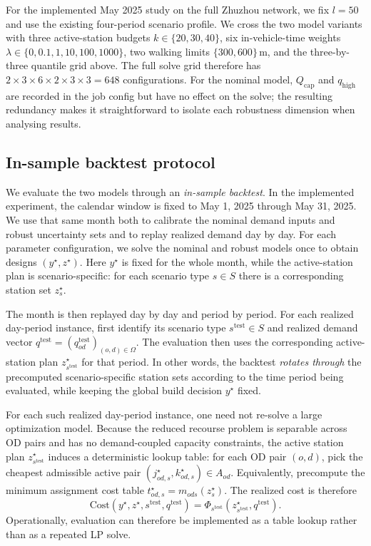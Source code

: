 \documentclass[11pt]{article}
\theoremstyle{definition}
\begin{document}
For the implemented May 2025 study on the full Zhuzhou network, we fix
$l = 50$ and use the existing four-period scenario profile.  We cross
the two model variants with three active-station budgets
$k \in \{20, 30, 40\}$, six in-vehicle-time weights
$\lambda \in \{0, 0.1, 1, 10, 100, 1000\}$, two walking limits
$\{300, 600\}$\,m, and the three-by-three quantile grid above.  The
full solve grid therefore has
$2 \times 3 \times 6 \times 2 \times 3 \times 3 = 648$ configurations.
For the nominal model, $Q_{\mathrm{cap}}$ and $q_{\mathrm{high}}$ are
recorded in the job config but have no effect on the solve; the resulting
redundancy makes it straightforward to isolate each robustness dimension
when analysing results.

\subsection{In-sample backtest protocol}
\label{sec:oos}

We evaluate the two models through an \emph{in-sample backtest}.  In the
implemented experiment, the calendar window is fixed to May 1, 2025 through
May 31, 2025.  We use that same month both to calibrate the nominal demand
inputs and robust uncertainty sets and to replay realized demand day by day.
For each parameter configuration, we solve the nominal and robust models once to obtain designs
$(y^\star, z^\star)$.  Here $y^\star$ is fixed for the whole month, while the
active-station plan is scenario-specific: for each scenario type
$s \in S$ there is a corresponding station set $z_s^\star$.

The month is then replayed day by day and period by period.  For each realized
day-period instance, first identify its scenario type
$s^{\mathrm{test}} \in S$ and realized demand vector
$q^{\mathrm{test}} = (q^{\mathrm{test}}_{od})_{(o,d)\in\Omega}$.  The
evaluation then uses the corresponding active-station plan
$z_{s^{\mathrm{test}}}^\star$ for that period.  In other words, the backtest
\emph{rotates through} the precomputed scenario-specific station sets according
to the time period being evaluated, while keeping the global build decision
$y^\star$ fixed.

For each such realized day-period instance, one need not re-solve a large
optimization model.  Because the reduced recourse problem is separable across OD
pairs and has no demand-coupled capacity constraints, the active station plan
$z_{s^{\mathrm{test}}}^\star$ induces a deterministic lookup table: for each OD
pair $(o,d)$, pick the cheapest admissible active pair
$(j^\star_{od,s}, k^\star_{od,s}) \in A_{od}$.  Equivalently, precompute the
minimum assignment cost table $t^\star_{od,s} = m_{ods}(z_s^\star)$.  The
realized cost is therefore
\begin{equation}
	\mathrm{Cost}(y^\star,z^\star,s^{\mathrm{test}},q^{\mathrm{test}})
	=
	\Phi_{s^{\mathrm{test}}}(z_{s^{\mathrm{test}}}^\star, q^{\mathrm{test}}).
	\label{eq:realized-cost}
\end{equation}
Operationally, evaluation can therefore be implemented as a table lookup rather
than as a repeated LP solve.
\end{document}

